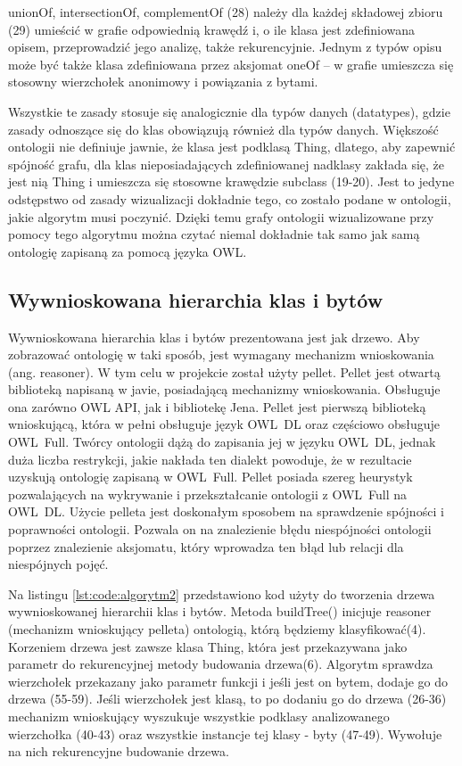  unionOf, intersectionOf, complementOf (28) należy dla każdej składowej zbioru (29) umieścić w grafie odpowiednią krawędź i, o ile klasa jest zdefiniowana opisem,
 przeprowadzić jego analizę, także rekurencyjnie. Jednym z typów opisu może być także klasa zdefiniowana przez aksjomat oneOf – w grafie umieszcza się stosowny 
wierzchołek anonimowy i powiązania z bytami.
\par
Wszystkie te zasady stosuje się analogicznie dla typów danych (datatypes), gdzie zasady odnoszące się do klas obowiązują również dla typów danych. 
Większość ontologii nie definiuje jawnie, że klasa jest podklasą Thing, dlatego, aby zapewnić spójność grafu, dla klas nieposiadających zdefiniowanej
 nadklasy zakłada się, że jest nią Thing i umieszcza się stosowne krawędzie subclass (19-20). Jest to jedyne odstępstwo od zasady wizualizacji dokładnie tego, 
co zostało podane w ontologii, jakie algorytm musi poczynić. Dzięki temu grafy ontologii wizualizowane przy pomocy tego algorytmu można czytać niemal dokładnie 
tak samo jak samą ontologię zapisaną za pomocą języka OWL.

\subsection{Wywnioskowana hierarchia klas i bytów}
\label{konwersja-tree}

Wywnioskowana hierarchia klas i bytów prezentowana jest jak drzewo. Aby zobrazować ontologię w taki sposób, jest wymagany mechanizm wnioskowania (ang. reasoner).
W tym celu w projekcie został użyty pellet. Pellet \cite{pellet} jest otwartą biblioteką napisaną w javie, posiadającą mechanizmy wnioskowania. Obsługuje ona
zarówno OWL API, jak i bibliotekę Jena. Pellet jest pierwszą biblioteką wnioskującą, która w pełni obsługuje język OWL~DL oraz częściowo obsługuje OWL~Full. Twórcy 
ontologii dążą do zapisania jej w języku OWL~DL, jednak duża liczba restrykcji, jakie nakłada ten dialekt powoduje, że w rezultacie uzyskują ontologię zapisaną w OWL~Full. 
Pellet posiada szereg heurystyk pozwalających na wykrywanie i przekształcanie ontologii z OWL~Full na OWL~DL. 
 Użycie pelleta jest doskonałym sposobem na sprawdzenie spójności i poprawności ontologii. Pozwala on na znalezienie błędu niespójności ontologii poprzez znalezienie 
aksjomatu,  który wprowadza ten błąd lub relacji dla niespójnych pojęć. 
\par
Na listingu \ref{lst:code:algorytm2} przedstawiono kod użyty do tworzenia drzewa wywnioskowanej hierarchii klas i bytów. Metoda buildTree() inicjuje reasoner 
(mechanizm wnioskujący pelleta) ontologią, którą będziemy klasyfikować(4). Korzeniem drzewa jest zawsze klasa Thing, która jest przekazywana jako parametr 
do rekurencyjnej metody budowania drzewa(6). Algorytm sprawdza wierzchołek przekazany jako parametr funkcji i jeśli jest on bytem, dodaje go do drzewa (55-59). Jeśli
 wierzchołek  jest klasą, to po dodaniu go do drzewa (26-36)  mechanizm wnioskujący wyszukuje wszystkie podklasy analizowanego wierzchołka (40-43)
oraz wszystkie instancje tej klasy - byty (47-49). Wywołuje na nich rekurencyjne budowanie drzewa. 



